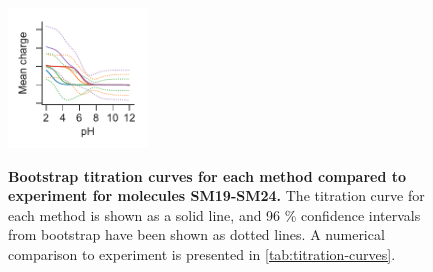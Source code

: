 \documentclass[9pt,lineno,final]{elife}
\begin{document}
\begin{figure}[H]
	\includegraphics[width=0.33\textwidth]{Reports/overview-virtual-titration-SM24.pdf}	 \\
	\caption{{\bf Bootstrap titration curves for each method compared to experiment for molecules SM19-SM24.} The titration curve for each method is shown as a solid line, and 96 \% confidence intervals from bootstrap have been shown as dotted lines. A numerical comparison to experiment is presented in \cref{tab:titration-curves}.
	\label{fig:charge-curves3}}

\end{figure}
\end{document}
